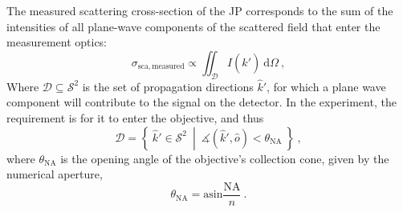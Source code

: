 \documentclass[10pt]{article}
\begin{document}
\begin{multicols}{2}
%
%




%


The measured scattering cross-section of the JP corresponds to the sum of the intensities of all plane-wave components of the scattered field that enter the measurement optics:
$$\sigma_\mathrm{sca,measured} \propto \iint_{\mathcal{D}} I\left( \hat{k}' \right) ~\mathrm{d}\Omega\ ,$$
Where $\mathcal{D} \subseteq \mathcal{S}^2$ is the set of propagation directions $\hat{k}'$, for which a plane wave component will contribute to the signal on the detector. 
In the experiment, the requirement is for it to enter the objective, and thus
$$
    \mathcal{D} = \left\lbrace\ \hat{k}' \in \mathcal{S}^2\ \middle\vert\ \measuredangle\!\left( \hat{k}', \hat{o}\right) < \theta_\mathrm{NA}\ \right\rbrace
    \ ,
$$
where $\theta_\mathrm{NA}$ is the opening angle of the objective's collection cone, given by the numerical aperture,
$$\theta_\mathrm{NA} = \mathrm{asin}\frac{\mathrm{NA}}{n} \ .$$


\end{multicols}
\end{document}
